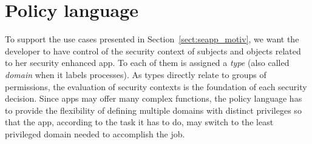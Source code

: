 \section{Policy language} \label{sect:seapp_lang}

To support the use cases presented in Section~\ref{sect:seapp_motiv},
we want the developer to have control of the \sel security context of
subjects and objects related to her security enhanced app.  To each of
them is assigned a {\em type} (also called {\em domain} when it labels
processes).  As types directly relate to groups of permissions, the
evaluation of security contexts is the foundation of each security
decision.  Since apps may offer many complex functions, the policy
language has to provide the flexibility of defining multiple domains
with distinct privileges so that the app, according to the task it has
to do, may switch to the least privileged domain needed to accomplish
the job.

